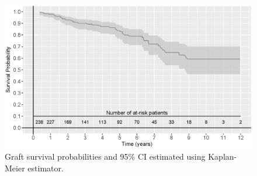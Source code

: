 \begin{figure}[!htb]
\centerline{\includegraphics[width=\columnwidth]{images/km.eps}}
\caption{Graft survival probabilities and 95\% CI estimated using Kaplan-Meier estimator.}
\label{fig : km_curve}
\end{figure}
